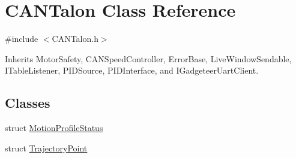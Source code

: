 \hypertarget{class_c_a_n_talon}{}\section{C\+A\+N\+Talon Class Reference}
\label{class_c_a_n_talon}


{\ttfamily \#include $<$C\+A\+N\+Talon.\+h$>$}



Inherits Motor\+Safety, C\+A\+N\+Speed\+Controller, Error\+Base, Live\+Window\+Sendable, I\+Table\+Listener, P\+I\+D\+Source, P\+I\+D\+Interface, and I\+Gadgeteer\+Uart\+Client.

\subsection*{Classes}
\begin{DoxyCompactItemize}
\item 
struct \hyperlink{struct_c_a_n_talon_1_1_motion_profile_status}{Motion\+Profile\+Status}
\item 
struct \hyperlink{struct_c_a_n_talon_1_1_trajectory_point}{Trajectory\+Point}
\end{DoxyCompactItemize}
